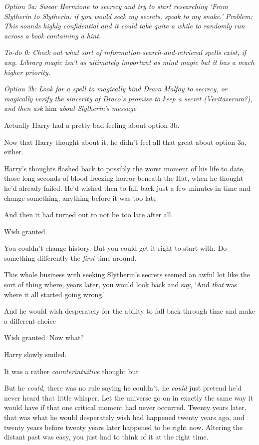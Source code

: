 \emph{Option 3a: Swear Hermione to secrecy and try to start researching `From
Slytherin to Slytherin: if you would seek my secrets, speak to my snake.'
Problem: This sounds highly confidential and it could take quite a while to
randomly run across a book containing a hint.}

\emph{To-do 0: Check out what sort of information-search-and-retrieval spells
exist, if any. Library magic isn't as ultimately important as mind magic but it
has a much higher priority.}

\emph{Option 3b: Look for a spell to magically bind Draco Malfoy to secrecy, or
magically verify the sincerity of Draco's promise to keep a secret
(Veritaserum?), and then ask} him \emph{about Slytherin's message{\el}}

Actually{\el} Harry had a pretty bad feeling about option 3b.

Now that Harry thought about it, he didn't feel all that great about option 3a,
either.

Harry's thoughts flashed back to possibly the worst moment of his life to date,
those long seconds of blood-freezing horror beneath the Hat, when he thought
he'd already failed. He'd wished then to fall back just a few minutes in time
and change something, anything before it was too late{\el}

And then it had turned out to not be too late after all.

Wish granted.

You couldn't change history. But you could get it right to start with. Do
something differently the \emph{first} time around.

This whole business with seeking Slytherin's secrets{\el} seemed an awful
lot like the sort of thing where, years later, you would look back and say,
`And \emph{that} was where it all started going wrong.'

And he would wish desperately for the ability to fall back through time and
make a different choice{\el}

Wish granted. Now what?

Harry slowly smiled.

It was a rather \emph{counterintuitive} thought{\el} but{\el}

But he \emph{could,} there was no rule saying he couldn't, he \emph{could} just
pretend he'd never heard that little whisper. Let the universe go on in exactly
the same way it would have if that one critical moment had never occurred.
Twenty years later, that was what he would desperately wish had happened twenty
years ago, and twenty years before twenty years later happened to be right now.
Altering the distant past was easy, you just had to think of it at the right
time.

